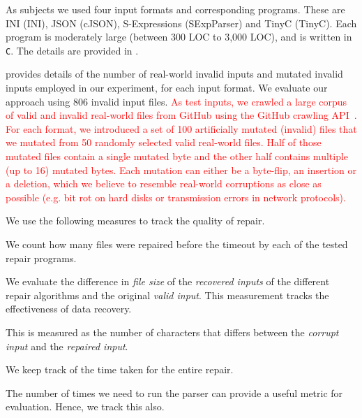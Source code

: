 \documentclass[sigconf,review,anonymous]{acmart}
\def\<#1>{\texttt{#1}}
\newcounter{todocounter}
\newcommand{\todo}[1]{\marginpar{$|$}\textcolor{red}{\stepcounter{todocounter}\footnote[\thetodocounter]{\textcolor{red}{\textbf{TODO }}\textit{#1}}}}
\newcommand{\recheck}[1]{\textcolor{red}{#1}}
\renewcommand{\todo}[1]{}
\begin{document}
As subjects we used four input formats and corresponding programs.
These are INI (INI), JSON (cJSON), S-Expressions (SExpParser) and TinyC (TinyC).
Each program is moderately large (between 300 LOC to 3,000 LOC), and is written in \<C>.
The details are provided in .

 provides details of the number of
real-world invalid inputs and mutated invalid inputs employed in our experiment,
for each input format. We evaluate our approach using 806 invalid input files.
\recheck{
As test inputs, we crawled a large corpus of valid and invalid real-world files
from GitHub using the GitHub crawling API~\cite{githubapi}.
For each format, we introduced a set of 100 artificially mutated (invalid) files
that we mutated from 50 randomly selected valid real-world files.
Half of those mutated files contain a single mutated byte and the other half
contains multiple (up to 16) mutated bytes.
Each mutation can either be a byte-flip, an insertion or a deletion, which
we believe to resemble real-world corruptions as close as possible
(e.g. bit rot on hard disks or transmission errors in network protocols).}



We use the following measures to track the quality of repair.
\begin{description}[wide, labelwidth=!, labelindent=0pt]
\item[Number of Repaired Inputs:] We count how many files were repaired before
the timeout by each of the tested repair programs.
\item[File Size Difference:] We evaluate the difference in \emph{file size} of
the \emph{recovered inputs} of the different repair algorithms and the original
\emph{valid input}. This measurement tracks the effectiveness of data recovery.
\item[Edit Distance:] This is measured as the number of characters that
differs between the \emph{corrupt input} and the \emph{repaired input}.
\item[Runtime:] We keep track of the time taken for the entire repair.
\item[Number of Program Runs:] The number of times we need to run the
parser can provide a useful metric for evaluation. Hence, we track this also.
\end{description}
\end{document}

